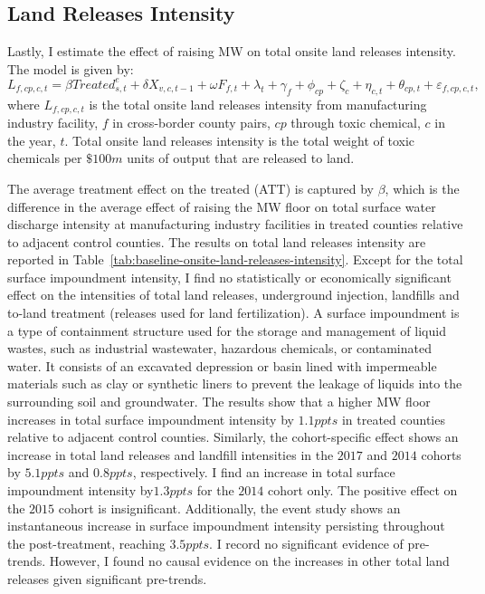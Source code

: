 \documentclass{C:/Users/david/OneDrive/Documents/ULMS/PhD/Thesis/chapter3/src/climate_change/latex/Economic_Journal/OUP-EJ}
\begin{document}
    \subsection{Land Releases Intensity}\label{subsec:land-releases-intensity}
    Lastly, I estimate the effect of raising MW on total onsite land releases intensity. The model is given by:
    \begin{equation}
        L_{f,cp,c,t} = \beta Treated_{s,t}^e + \delta X_{v,c,t-1} + \omega F_{f,t} + \lambda_{t} + \gamma_{f} + \phi_{cp} + \zeta_{c} + \eta_{c,t} + \theta_{cp,t} + \varepsilon_{f,cp,c,t},\label{eq:baseline-onsite-land-releases-intensity}
    \end{equation}
    where $L_{f,cp,c,t}$ is the total onsite land releases intensity from manufacturing industry facility, $f$ in cross-border county pairs, $cp$ through toxic chemical, $c$ in the year, $t$. Total onsite land releases intensity is the total weight of toxic chemicals per $\$100m$ units of output that are released to land.
    

    The average treatment effect on the treated (ATT) is captured by $\beta$, which is the difference in the average effect of raising the MW floor on total surface water discharge intensity at manufacturing industry facilities in treated counties relative to adjacent control counties. The results on total land releases intensity are reported in Table~\ref{tab:baseline-onsite-land-releases-intensity}. Except for the total surface impoundment intensity, I find no statistically or economically significant effect on the intensities of total land releases, underground injection, landfills and to-land treatment (releases used for land fertilization). A surface impoundment is a type of containment structure used for the storage and management of liquid wastes, such as industrial wastewater, hazardous chemicals, or contaminated water. It consists of an excavated depression or basin lined with impermeable materials such as clay or synthetic liners to prevent the leakage of liquids into the surrounding soil and groundwater. The results show that a higher MW floor increases in total surface impoundment intensity by $1.1ppts$ in treated counties relative to adjacent control counties. Similarly, the cohort-specific effect shows an increase in total land releases and landfill intensities in the $2017$ and $2014$ cohorts by $5.1ppts$ and $0.8ppts$, respectively. I find an increase in total surface impoundment intensity by$1.3ppts$ for the $2014$ cohort only. The positive effect on the $2015$ cohort is insignificant. Additionally, the event study shows an instantaneous increase in surface impoundment intensity persisting throughout the post-treatment, reaching $3.5ppts$. I record no significant evidence of pre-trends. However, I found no causal evidence on the increases in other total land releases given significant pre-trends.
    
\end{document}
